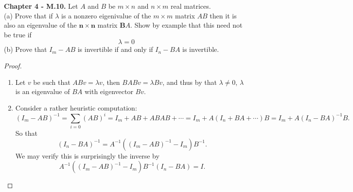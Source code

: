 \documentclass[10pt]{report}
\theoremstyle{definition}
\begin{document}
\textbf{Chapter 4 - M.10.} Let $A$ and $B$ be $m \times n$ and $n \times m$ real matrices.\\
(a) Prove that if $\lambda$ is a nonzero eigenivalue of the $m \times m$ matrix $A B$ then it is also an eigenvalue of the $\boldsymbol{n} \times \boldsymbol{n}$ matrix $\boldsymbol{B} A$. Show by example that this need not be true if
\[
\lambda=0
\]
(b) Prove that $I_{m}-A B$ is invertible if and only if $I_{n}-B A$ is invertible.
\begin{proof}{}\leavevmode{}
\begin{enumerate}[label=(\alph*)]
\item
Let $v$ be such that $ABv=\lambda v$, then $BABv=\lambda Bv$, and thus by that $\lambda\neq0$, $\lambda$ is an eigenvalue of $BA$ with eigenvector $Bv$.
\item Consider a rather heuristic computation:
$$(I_m-AB)^{-1}=\sum_{i=0}(AB)^i=I_m+AB+ABAB+\cdots=I_m+A(I_n+BA+\cdots)B=I_m+A(I_n-BA)^{-1}B.$$
So that
$$(I_n-BA)^{-1}=A^{-1}((I_m-AB)^{-1}-I_m)B^{-1}.$$
We may verify this is surprisingly the inverse by
$$A^{-1}((I_m-AB)^{-1}-I_m)B^{-1}(I_n-BA)=I.$$
\end{enumerate}
\end{proof}
\end{document}
